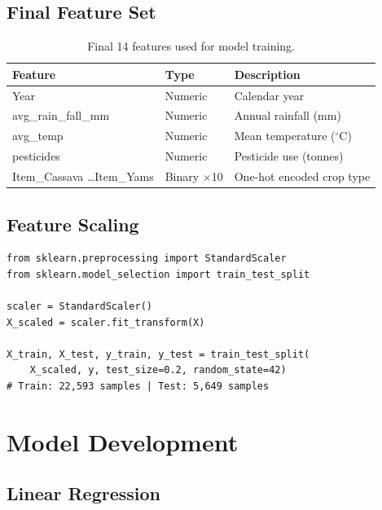 \documentclass[12pt,a4paper]{article}
\begin{document}
\subsection{Final Feature Set}

\begin{table}[H]
\centering
\caption{Final 14 features used for model training.}
\renewcommand{\arraystretch}{1.3}
\begin{tabularx}{\textwidth}{L{4cm} C{2.5cm} X}
\toprule
{}
\color{white}\textbf{Feature} & \color{white}\textbf{Type} & \color{white}\textbf{Description} \\
\midrule
{}
Year                       & Numeric      & Calendar year \\
avg\_rain\_fall\_mm        & Numeric      & Annual rainfall (mm) \\
avg\_temp                  & Numeric      & Mean temperature ($^\circ$C) \\
pesticides                 & Numeric      & Pesticide use (tonnes) \\
Item\_Cassava \ldots Item\_Yams & Binary $\times$10 & One-hot encoded crop type \\
\bottomrule
\end{tabularx}
\end{table}

\subsection{Feature Scaling}

\begin{lstlisting}[caption={Scaling features and splitting data.}]
from sklearn.preprocessing import StandardScaler
from sklearn.model_selection import train_test_split

scaler = StandardScaler()
X_scaled = scaler.fit_transform(X)

X_train, X_test, y_train, y_test = train_test_split(
    X_scaled, y, test_size=0.2, random_state=42)
# Train: 22,593 samples | Test: 5,649 samples
\end{lstlisting}

\section{Model Development}

\subsection{Linear Regression}
\end{document}
